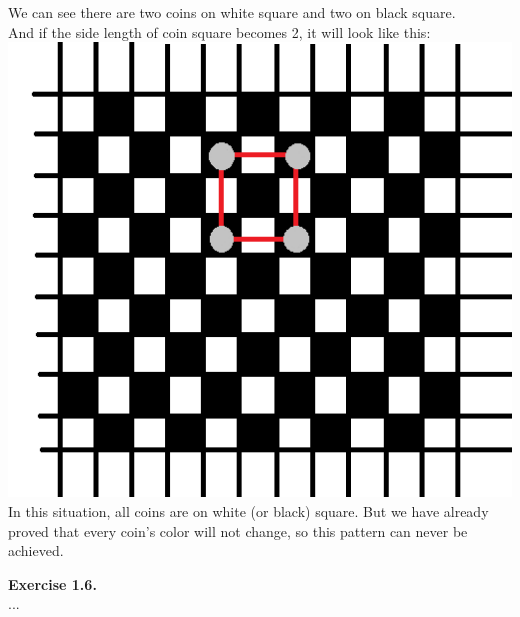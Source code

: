 \documentclass{article}
\begin{document}
\begin{flushleft}
We can see there are two coins on white square and two on black square.\\
And if the side length of coin square becomes 2, it will look like this:
\includegraphics[scale=0.8]{1_5_3.png}\\
In this situation, all coins are on white (or black) square. 
But we have already proved that every coin's color will not change, so this pattern can never be achieved.

\textbf{Exercise 1.6.} \\
...


\end{flushleft}
\end{document}
